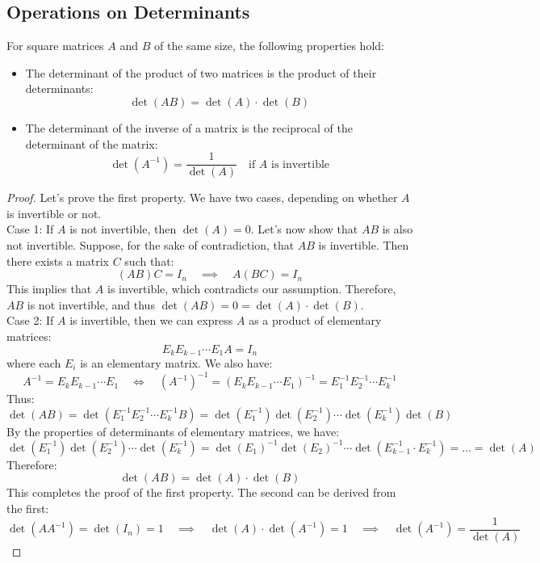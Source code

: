 \subsection{Operations on Determinants}
\begin{theorem}
    For square matrices \(A\) and \(B\) of the same size, the following properties hold:
    \begin{itemize}[itemsep=1pt,label=$\circ$]
        \item The determinant of the product of two matrices is the product of their determinants:
        \[
            \det(AB) = \det(A) \cdot \det(B)
        \]
        \item The determinant of the inverse of a matrix is the reciprocal of the determinant of the matrix:
        \[
            \det(A^{-1}) = \frac{1}{\det(A)} \quad \text{if } A \text{ is invertible}
        \]
    \end{itemize}
\end{theorem}
\begin{proof}
    Let's prove the first property. We have two cases, depending on whether \(A\) is invertible or not. \\
    Case 1: If \(A\) is not invertible, then \(\det(A) = 0\). Let's now show that $AB$ is also not invertible. Suppose, for the sake of contradiction, that \(AB\) is invertible. Then there exists a matrix \(C\) such that:
    \[
        (AB)C = I_n \quad \implies \quad A(BC) = I_n
    \]
    This implies that \(A\) is invertible, which contradicts our assumption. Therefore, \(AB\) is not invertible, and thus \(\det(AB) = 0 = \det(A) \cdot \det(B)\). \\
    Case 2: If \(A\) is invertible, then we can express \(A\) as a product of elementary matrices:
    \[
        E_k E_{k-1} \cdots E_1 A = I_n
    \]
    where each \(E_i\) is an elementary matrix. We also have:
    \[
        A^{-1} = E_k E_{k-1} \cdots E_1 \quad \iff \quad (A^{-1})^{-1} = (E_k E_{k-1} \cdots E_1)^{-1} = E_1^{-1} E_2^{-1} \cdots E_k^{-1}
    \]
    Thus:
    \[
        \det(AB) = \det(E_1^{-1} E_2^{-1} \cdots E_k^{-1} B) = \det(E_1^{-1}) \det(E_2^{-1}) \cdots \det(E_k^{-1}) \det(B)
    \]
    By the properties of determinants of elementary matrices, we have:
    \[
        \det(E_1^{-1}) \det(E_2^{-1}) \cdots \det(E_k^{-1}) = \det(E_1)^{-1} \det(E_2)^{-1} \cdots \det(E_{k-1}^{-1} \cdot E_k^{-1}) = \dots = \det(A)
    \]
    Therefore:
    \[
        \det(AB) = \det(A) \cdot \det(B)
    \]
    This completes the proof of the first property. The second can be derived from the first:
    \[
        \det(AA^{-1}) = \det(I_n) = 1 \quad \implies \quad \det(A) \cdot \det(A^{-1}) = 1 \quad \implies \quad \det(A^{-1}) = \frac{1}{\det(A)}
    \]
\end{proof}

